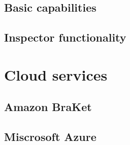 \documentclass[11pt,a4paper]{article}
\begin{document}
\subsection{Basic capabilities}

\subsection{Inspector functionality}




\section{Cloud services}

\subsection{Amazon BraKet}

\subsection{Miscrosoft Azure}
\end{document}
